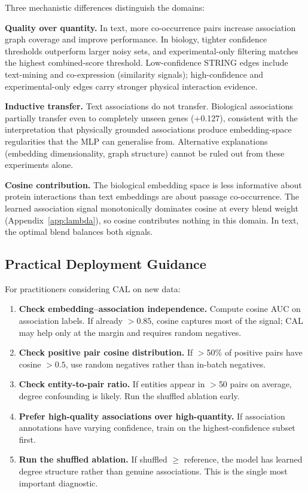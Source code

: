 \documentclass[11pt]{article}
\begin{document}
Three mechanistic differences distinguish the domains:

\textbf{Quality over quantity.} In text, more co-occurrence pairs increase association graph coverage and improve performance. In biology, tighter confidence thresholds outperform larger noisy sets, and experimental-only filtering matches the highest combined-score threshold. Low-confidence STRING edges include text-mining and co-expression (similarity signals); high-confidence and experimental-only edges carry stronger physical interaction evidence.

\textbf{Inductive transfer.} Text associations do not transfer. Biological associations partially transfer even to completely unseen genes (+0.127), consistent with the interpretation that physically grounded associations produce embedding-space regularities that the MLP can generalise from. Alternative explanations (embedding dimensionality, graph structure) cannot be ruled out from these experiments alone.

\textbf{Cosine contribution.} The biological embedding space is less informative about protein interactions than text embeddings are about passage co-occurrence. The learned association signal monotonically dominates cosine at every blend weight (Appendix~\ref{app:lambda}), so cosine contributes nothing in this domain. In text, the optimal blend balances both signals.

\subsection{Practical Deployment Guidance}

For practitioners considering CAL on new data:

\begin{enumerate}
    \item \textbf{Check embedding--association independence.} Compute cosine AUC on association labels. If already $> 0.85$, cosine captures most of the signal; CAL may help only at the margin and requires random negatives.
    \item \textbf{Check positive pair cosine distribution.} If $>$50\% of positive pairs have cosine $> 0.5$, use random negatives rather than in-batch negatives.
    \item \textbf{Check entity-to-pair ratio.} If entities appear in $>$50 pairs on average, degree confounding is likely. Run the shuffled ablation early.
    \item \textbf{Prefer high-quality associations over high-quantity.} If association annotations have varying confidence, train on the highest-confidence subset first.
    \item \textbf{Run the shuffled ablation.} If shuffled $\geq$ reference, the model has learned degree structure rather than genuine associations. This is the single most important diagnostic.
\end{enumerate}
\end{document}
